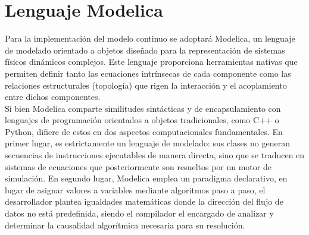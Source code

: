 




\section{Lenguaje Modelica}
Para la implementación del modelo continuo se adoptará Modelica, un lenguaje de modelado orientado a objetos diseñado para la representación de sistemas físicos dinámicos complejos. Este lenguaje proporciona herramientas nativas que permiten definir tanto las ecuaciones intrínsecas de cada componente como las relaciones estructurales (topología) que rigen la interacción y el acoplamiento entre dichos componentes.\\

Si bien Modelica comparte similitudes sintácticas y de encapsulamiento con lenguajes de programación orientados a objetos tradicionales, como C++ o Python, difiere de estos en dos aspectos computacionales fundamentales. En primer lugar, es estrictamente un lenguaje de modelado: sus clases no generan secuencias de instrucciones ejecutables de manera directa, sino que se traducen en sistemas de ecuaciones que posteriormente son resueltos por un motor de simulación. En segundo lugar, Modelica emplea un paradigma declarativo, en lugar de asignar valores a variables mediante algoritmos paso a paso, el desarrollador plantea igualdades matemáticas donde la dirección del flujo de datos no está predefinida, siendo el compilador el encargado de analizar y determinar la causalidad algorítmica necesaria para su resolución.\\

